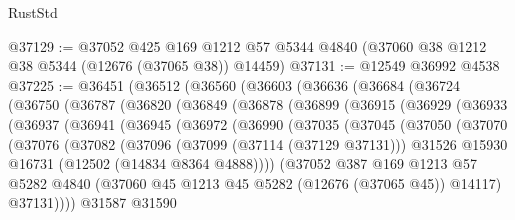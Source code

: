 \begin{lexlean}{RustStd}
\begin{coremodule}
@37129 := @37052
    @425
    @169
    @1212
    @57
    @5344
    @4840
    (@37060 @38 @1212 @38 @5344 (@12676 (@37065 @38)) @14459)
@37131 := @12549 @36992 @4538
@37225 := @36451
    (@36512
      (@36560
        (@36603
          (@36636
            (@36684
              (@36724
                (@36750
                  (@36787
                    (@36820
                      (@36849
                        (@36878
                          (@36899
                            (@36915
                              (@36929
                                (@36933
                                  (@36937
                                    (@36941
                                      (@36945
                                        (@36972
                                          (@36990
                                            (@37035
                                              (@37045
                                                (@37050
                                                  (@37070
                                                    (@37076
                                                      (@37082
                                                        (@37096
                                                          (@37099 (@37114 (@37129 @37131)))
                                                          @31526
                                                          @15930
                                                          @16731
                                                          (@12502 (@14834 @8364 @4888))))
                                                      (@37052
                                                        @387
                                                        @169
                                                        @1213
                                                        @57
                                                        @5282
                                                        @4840
                                                        (@37060
                                                          @45
                                                          @1213
                                                          @45
                                                          @5282
                                                          (@12676 (@37065 @45))
                                                          @14117)
                                                        @37131))))
                                                @31587
                                                @31590

\end{coremodule}
\end{lexlean}

